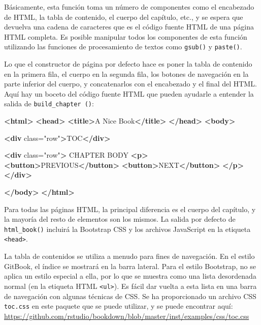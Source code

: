 \documentclass[12pt,]{krantz}
\makeatletter
\newenvironment{Shaded}{\begin{snugshade}}{\end{snugshade}}
\newcommand{\KeywordTok}[1]{\textcolor[rgb]{0.13,0.29,0.53}{\textbf{{#1}}}}
\newcommand{\StringTok}[1]{\textcolor[rgb]{0.31,0.60,0.02}{{#1}}}
\newcommand{\OtherTok}[1]{\textcolor[rgb]{0.56,0.35,0.01}{{#1}}}
\newcommand{\NormalTok}[1]{{#1}}
\newenvironment{kframe}{%
\medskip{}
\setlength{\fboxsep}{.8em}
 \def\at@end@of@kframe{}%
 \ifinner\ifhmode%
  \def\at@end@of@kframe{\end{minipage}}%
  \begin{minipage}{\columnwidth}%
 \fi\fi%
 \def\FrameCommand##1{\hskip\@totalleftmargin \hskip-\fboxsep
 \colorbox{shadecolor}{##1}\hskip-\fboxsep
     \hskip-\linewidth \hskip-\@totalleftmargin \hskip\columnwidth}%
 \MakeFramed {\advance\hsize-\width
   \@totalleftmargin\z@ \linewidth\hsize
   \@setminipage}}%
 {\par\unskip\endMakeFramed%
 \at@end@of@kframe}
\renewenvironment{Shaded}{\begin{kframe}}{\end{kframe}}
\theoremstyle{definition}
\theoremstyle{definition}
\theoremstyle{remark}
\makeatother
\begin{document}
Básicamente, esta función toma un número de componentes como el
encabezado de HTML, la tabla de contenido, el cuerpo del capítulo, etc.,
y se espera que devuelva una cadena de caracteres que es el código
fuente HTML de una página HTML completa. Es posible manipular todos los
componentes de esta función utilizando las funciones de procesamiento de
textos como \texttt{gsub()} y \texttt{paste()}.

Lo que el constructor de página por defecto hace es poner la tabla de
contenido en la primera fila, el cuerpo en la segunda fila, los botones
de navegación en la parte inferior del cuerpo, y concatenarlos con el
encabezado y el final del HTML. Aquí hay un boceto del código fuente
HTML que pueden ayudarle a entender la salida de
\texttt{build\_chapter\ ()}:

\begin{Shaded}
\begin{Highlighting}[]
\KeywordTok{<html>}
  \KeywordTok{<head>}
    \KeywordTok{<title>}\NormalTok{A Nice Book}\KeywordTok{</title>}
  \KeywordTok{</head>}
  \KeywordTok{<body>}
  
    \KeywordTok{<div}\OtherTok{ class=}\StringTok{"row"}\KeywordTok{>}\NormalTok{TOC}\KeywordTok{</div>}
    
    \KeywordTok{<div}\OtherTok{ class=}\StringTok{"row"}\KeywordTok{>}
      \NormalTok{CHAPTER BODY}
      \KeywordTok{<p>}
        \KeywordTok{<button>}\NormalTok{PREVIOUS}\KeywordTok{</button>}
        \KeywordTok{<button>}\NormalTok{NEXT}\KeywordTok{</button>}
      \KeywordTok{</p>}
    \KeywordTok{</div>}
  
  \KeywordTok{</body>}
\KeywordTok{</html>}
\end{Highlighting}
\end{Shaded}

Para todas las páginas HTML, la principal diferencia es el cuerpo del
capítulo, y la mayoría del resto de elementos son los mismos. La salida
por defecto de \texttt{html\_book()} incluirá la Bootstrap CSS y los
archivos JavaScript en la etiqueta
\texttt{\textless{}head\textgreater{}}.

La tabla de contenidos se utiliza a menudo para fines de navegación. En
el estilo GitBook, el índice se mostrará en la barra lateral. Para el
estilo Bootstrap, no se aplica un estilo especial a ella, por lo que se
muestra como una lista desordenada normal (en la etiqueta HTML
\texttt{\textless{}ul\textgreater{}}). Es fácil dar vuelta a esta lista
en una barra de navegación con algunas técnicas de CSS. Se ha
proporcionado un archivo CSS \texttt{toc.css} en este paquete que se
puede utilizar, y se puede encontrar aquí:
\url{https://github.com/rstudio/bookdown/blob/master/inst/examples/css/toc.css}
\end{document}
